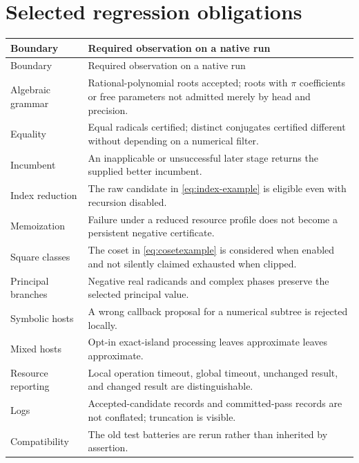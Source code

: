 \documentclass[11pt,letterpaper]{article}
\numberwithin{equation}{section}
\theoremstyle{definition}\newtheorem{definition}[theorem]{Definition}
\theoremstyle{remark}\newtheorem{remark}[theorem]{Remark}
\begin{document}
\section{Selected regression obligations}
\begin{longtable}{@{}P{0.28\textwidth}P{0.67\textwidth}@{}}
\toprule Boundary & Required observation on a native run\\\midrule\endfirsthead
\toprule Boundary & Required observation on a native run\\\midrule\endhead
Algebraic grammar & Rational-polynomial roots accepted; roots with $\pi$ coefficients or free parameters not admitted merely by head and precision.\\
Equality & Equal radicals certified; distinct conjugates certified different without depending on a numerical filter.\\
Incumbent & An inapplicable or unsuccessful later stage returns the supplied better incumbent.\\
Index reduction & The raw candidate in \eqref{eq:index-example} is eligible even with recursion disabled.\\
Memoization & Failure under a reduced resource profile does not become a persistent negative certificate.\\
Square classes & The coset in \eqref{eq:cosetexample} is considered when enabled and not silently claimed exhausted when clipped.\\
Principal branches & Negative real radicands and complex phases preserve the selected principal value.\\
Symbolic hosts & A wrong callback proposal for a numerical subtree is rejected locally.\\
Mixed hosts & Opt-in exact-island processing leaves approximate leaves approximate.\\
Resource reporting & Local operation timeout, global timeout, unchanged result, and changed result are distinguishable.\\
Logs & Accepted-candidate records and committed-pass records are not conflated; truncation is visible.\\
Compatibility & The old test batteries are rerun rather than inherited by assertion.\\
\bottomrule
\end{longtable}
\end{document}
